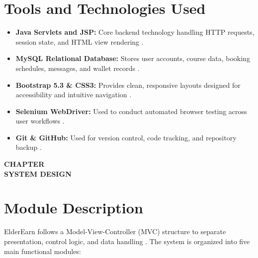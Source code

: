 \documentclass[12pt,a4paper]{report}
\newcommand{\chaptertitlepage}[1]{%
  \clearpage
  \thispagestyle{empty}
  \null
  \vfill
  \begin{center}
    {\fontsize{16pt}{18pt}\selectfont\bfseries CHAPTER \thechapter}\\[0.5cm]
    {\fontsize{16pt}{18pt}\selectfont\bfseries #1}
  \end{center}
  \vfill
  \null
  \clearpage
  \setcounter{section}{0}
}
\begin{document}
\section{Tools and Technologies Used}
\begin{itemize}[leftmargin=1.5em, itemsep=2pt]
  \item \textbf{Java Servlets and JSP:} Core backend technology handling HTTP requests, session state, and HTML view rendering \cite{oracleservlets, oraclejsp}.
  \item \textbf{MySQL Relational Database:} Stores user accounts, course data, booking schedules, messages, and wallet records \cite{mysqlref}.
  \item \textbf{Bootstrap 5.3 \& CSS3:} Provides clean, responsive layouts designed for accessibility and intuitive navigation \cite{bootstrap5}.
  \item \textbf{Selenium WebDriver:} Used to conduct automated browser testing across user workflows \cite{seleniumref}.
  \item \textbf{Git \& GitHub:} Used for version control, code tracking, and repository backup \cite{gitscm}.
\end{itemize}


\chaptertitlepage{SYSTEM DESIGN}

\section{Module Description}
ElderEarn follows a Model-View-Controller (MVC) structure to separate presentation, control logic, and data handling \cite{fowler}. The system is organized into five main functional modules:
\end{document}
